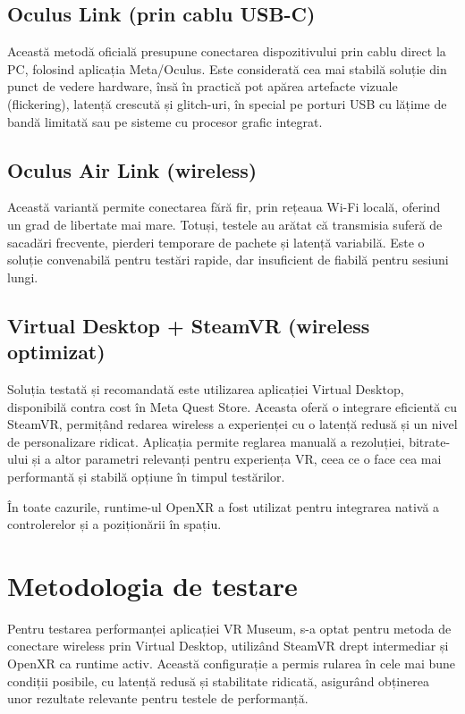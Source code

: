 \subsection{Oculus Link (prin cablu USB-C)}

Această metodă oficială presupune conectarea dispozitivului prin cablu direct la PC, folosind aplicația Meta/Oculus. Este considerată cea mai stabilă soluție din punct de vedere hardware, însă în practică pot apărea artefacte vizuale (flickering), latență crescută și glitch-uri, în special pe porturi USB cu lățime de bandă limitată sau pe sisteme cu procesor grafic integrat.

\subsection{Oculus Air Link (wireless)}

Această variantă permite conectarea fără fir, prin rețeaua Wi-Fi locală, oferind un grad de libertate mai mare. Totuși, testele au arătat că transmisia suferă de sacadări frecvente, pierderi temporare de pachete și latență variabilă. Este o soluție convenabilă pentru testări rapide, dar insuficient de fiabilă pentru sesiuni lungi.

\subsection{Virtual Desktop + SteamVR (wireless optimizat)}

Soluția testată și recomandată este utilizarea aplicației Virtual Desktop, disponibilă contra cost în Meta Quest Store. Aceasta oferă o integrare eficientă cu SteamVR, permițând redarea wireless a experienței cu o latență redusă și un nivel de personalizare ridicat. Aplicația permite reglarea manuală a rezoluției, bitrate-ului și a altor parametri relevanți pentru experiența VR, ceea ce o face cea mai performantă și stabilă opțiune în timpul testărilor.

În toate cazurile, runtime-ul OpenXR a fost utilizat pentru integrarea nativă a controlerelor și a poziționării în spațiu.


\section{Metodologia de testare}
Pentru testarea performanței aplicației VR Museum, s-a optat pentru metoda de conectare wireless prin Virtual Desktop, utilizând SteamVR drept intermediar și OpenXR ca runtime activ. Această configurație a permis rularea în cele mai bune condiții posibile, cu latență redusă și stabilitate ridicată, asigurând obținerea unor rezultate relevante pentru testele de performanță.

